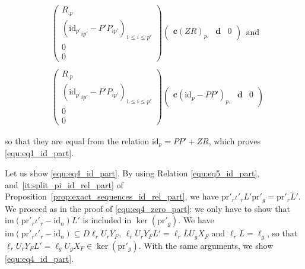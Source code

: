 \documentclass{ifacconf}
\newcommand\g[1]{\textbf{#1}}
\newcommand\id[1]{\text{id}_{#1}}
\newcommand\im{\text{im}}
\newcommand\p{\text{pr}}
\begin{document}
\begin{small}
  \[\begin{split}
  &\begin{pmatrix}
  R_{.p}\\
  \left({\id{p'}}_{ip'}-P'P_{ip'}\right)_{1\leq i\leq p'}\\
  0\\
  0
  \end{pmatrix}\begin{pmatrix}
    \g{c}\left(ZR\right)_{p.} & \g{d} & 0
  \end{pmatrix}\ \ \text{and}\\
  & \\
  &\begin{pmatrix}
    R_{.p}\\
    \left({\id{p'}}_{ip'}-P'P_{ip'}\right)_{1\leq i\leq p'}\\
    0\\
    0
  \end{pmatrix}\begin{pmatrix}
    \g{c}\left(\id{p}-PP'\right)_{p.} & \g{d} & 0
  \end{pmatrix}
  \end{split}\]
\end{small}
so that they are equal from the relation $\id{p}=PP'+ZR$, which proves
\eqref{equ:eq1_id_part}.

Let us show \eqref{equ:eq4_id_part}. By using Relation
\eqref{equ:eq5_id_part}, and~\ref{it:split_pi_id_rel_part} of
Proposition~\ref{prop:exact_sequences_id_rel_part}, we have $\p'_r
\iota'_rL'\p'_g=\p'_r\tilde{L}'$. We proceed as in the proof of
\eqref{equ:eq4_zero_part}: we only have to show that $\im(\p'_r\iota'_r
  -\id{n})L'$ is included in $\ker\left(\p'_g\right)$. We have $\im(
  \p'_r\iota'_r-\id{n})\subseteq D\ell_rU_rY_F$, $\ell_rU_rY_FL'=\ell_r
LU_gX_F$ and $\ell_rL=\ell_g$, so that $\ell_rU_rY_FL'=\ell_gU_gX_F\in
\ker(\p'_g)$. With the same arguments, we show \eqref{equ:eq4_id_part}.


\end{document}
